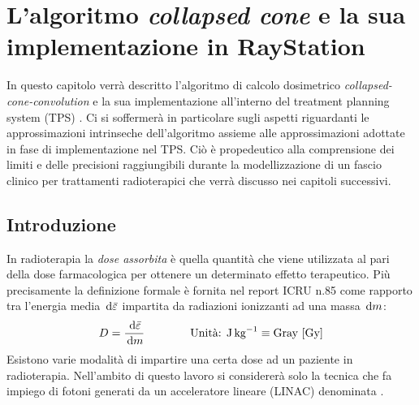 \chapter{L'algoritmo \emph{collapsed cone} e la sua implementazione in RayStation}
\setcounter{minitocdepth}{1}
\minitoc
\setcounter{minitocdepth}{2}
\textsf{In questo capitolo verrà descritto l'algoritmo di calcolo dosimetrico \textit{collapsed-cone-convolution} e la sua implementazione all'interno del treatment planning system (TPS) \RS. Ci si soffermerà in particolare sugli aspetti riguardanti le approssimazioni intrinseche dell'algoritmo assieme alle approssimazioni adottate in fase di implementazione nel TPS. Ciò è propedeutico alla comprensione dei limiti e delle precisioni raggiungibili durante la modellizzazione di un fascio clinico per trattamenti radioterapici che verrà discusso nei capitoli successivi.}

\section{Introduzione}
In radioterapia la \textit{dose assorbita} è quella quantità che viene utilizzata al pari della dose farmacologica per ottenere un determinato effetto terapeutico. Più precisamente la definizione formale è fornita nel report ICRU n.85 \cite{ICRU85} come rapporto tra l'energia media $\,\text{d} \bar{\varepsilon}$ impartita da radiazioni ionizzanti ad una massa $\,\text{d} m$:
\begin{equation}
D = \frac{\,\text{d} \bar{\varepsilon}}{\,\text{d} m} \qquad\qquad \text{Unità: J\,kg}^{-1} \equiv \text{Gray [Gy]}
\end{equation} 
Esistono varie modalità di impartire una certa dose ad un paziente in radioterapia. Nell'ambito di questo lavoro si considererà solo la tecnica che fa impiego di fotoni generati da un acceleratore lineare (LINAC) denominata .

